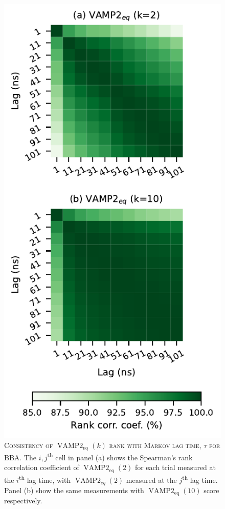 \documentclass[journal=jacsat,manuscript=article]{achemso}
\begin{document}
\begin{figure}[ht]
    \centering
    \includegraphics{results4/vampeq_rank_vs_lag.pdf}
    \caption{\textsc{Consistency of $\operatorname{VAMP2}_{\mathrm{eq}}(k)$ rank with Markov lag time, $\tau$ for BBA}. The $i, j$\textsuperscript{th} cell in panel (a) shows the Spearman's rank correlation coefficient of $\operatorname{VAMP2}_{\mathrm{eq}}(2)$ for each trial measured at the $i$\textsuperscript{th} lag time, with  $\operatorname{VAMP2}_{eq}(2)$  measured at the $j$\textsuperscript{th} lag time.   Panel (b) show the same measurements with $\operatorname{VAMP2}_{\mathrm{eq}}(10)$ score respectively. }
    \label{fig:vamp_rank_vs_lag}
\end{figure}
\end{document}
